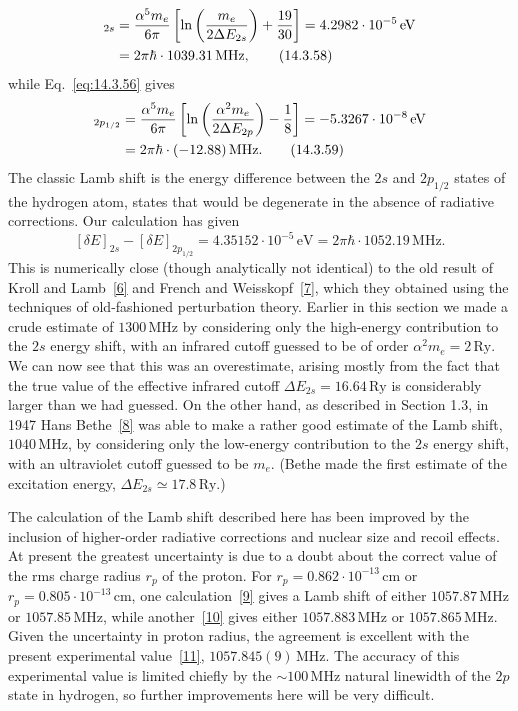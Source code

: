 \begin{align}
[\delta E]_{2s}
&=\frac{\alpha^5m_e}{6\pi}
\left[\ln\left(\frac{m_e}{2\Delta E_{2s}}\right)+\frac{19}{30}\right]
=4.2982\cdot10^{-5}\,\mathrm{eV}\notag\\
&=2\pi\hbar\cdot1039.31\,\mathrm{MHz},
\tag{14.3.58}\label{eq:14.3.58}
\end{align}
while Eq.~\eqref{eq:14.3.56} gives
\begin{align}
[\delta E]_{2p_{1/2}}
&=\frac{\alpha^5m_e}{6\pi}
\left[\ln\left(\frac{\alpha^2m_e}{2\Delta E_{2p}}\right)-\frac18\right]
=-5.3267\cdot10^{-8}\,\mathrm{eV}\notag\\
&=2\pi\hbar\cdot(-12.88)\,\mathrm{MHz}.
\tag{14.3.59}\label{eq:14.3.59}
\end{align}
The classic Lamb shift is the energy difference between the $2s$ and
$2p_{1/2}$ states of the hydrogen atom, states that would be degenerate in the
absence of radiative corrections. Our calculation has given
\[
[\delta E]_{2s}-[\delta E]_{2p_{1/2}}
=4.35152\cdot10^{-5}\,\mathrm{eV}
=2\pi\hbar\cdot1052.19\,\mathrm{MHz}.
\]
This is numerically close (though analytically not identical) to the old
result of Kroll and Lamb~\hyperlink{ref:14.6}{[6]} and French and
Weisskopf~\hyperlink{ref:14.7}{[7]}, which they obtained using the techniques
of old-fashioned perturbation theory. Earlier in this section we made a crude
estimate of $1300\,\mathrm{MHz}$ by considering only the high-energy
contribution to the $2s$ energy shift, with an infrared cutoff guessed to be
of order $\alpha^2m_e=2\,\mathrm{Ry}$. We can now see that this was an
overestimate, arising mostly from the fact that the true value of the
effective infrared cutoff $\Delta E_{2s}=16.64\,\mathrm{Ry}$ is considerably
larger than we had guessed. On the other hand, as described in Section 1.3, in
1947 Hans Bethe~\hyperlink{ref:14.8}{[8]} was able to make a rather good
estimate of the Lamb shift, $1040\,\mathrm{MHz}$, by considering only the
low-energy contribution to the $2s$ energy shift, with an ultraviolet cutoff
guessed to be $m_e$. (Bethe made the first estimate of the excitation energy,
$\Delta E_{2s}\simeq17.8\,\mathrm{Ry}$.)

The calculation of the Lamb shift described here has been improved by the
inclusion of higher-order radiative corrections and nuclear size and recoil
effects. At present the greatest uncertainty is due to a doubt about the
correct value of the rms charge radius $r_p$ of the proton. For
$r_p=0.862\cdot10^{-13}\,\mathrm{cm}$ or
$r_p=0.805\cdot10^{-13}\,\mathrm{cm}$, one
calculation~\hyperlink{ref:14.9}{[9]} gives a Lamb shift of either
$1057.87\,\mathrm{MHz}$ or $1057.85\,\mathrm{MHz}$, while
another~\hyperlink{ref:14.10}{[10]} gives either $1057.883\,\mathrm{MHz}$ or
$1057.865\,\mathrm{MHz}$. Given the uncertainty in proton radius, the
agreement is excellent with the present experimental
value~\hyperlink{ref:14.11}{[11]}, $1057.845(9)\,\mathrm{MHz}$. The accuracy of
this experimental value is limited chiefly by the
$\sim100\,\mathrm{MHz}$ natural linewidth of the $2p$ state in hydrogen, so
further improvements here will be very difficult.

